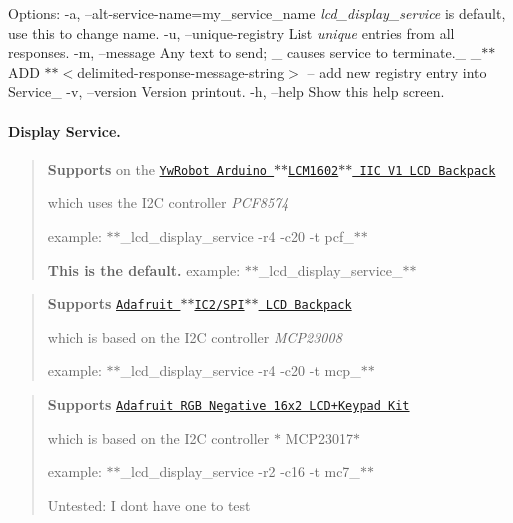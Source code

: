 Options\+: -\/a, --alt-\/service-\/name=my\+\_\+service\+\_\+name {\itshape lcd\+\_\+display\+\_\+service} is default, use this to change name. -\/u, --unique-\/registry List {\itshape unique} entries from all responses. -\/m, --message Any text to send; \+\_\+\textquotesingle{} causes service to terminate.\+\_\+ \+\_\+\textquotesingle{}$\ast$$\ast$\+A\+D\+D $\ast$$\ast$$<$delimited-\/response-\/message-\/string$>$\textquotesingle{} -- add new registry entry into Service\+\_\+ -\/v, --version Version printout. -\/h, --help Show this help screen.

\paragraph*{Display Service.}



\begin{quote}
{\bfseries Supports} on the \href{http://arduino-info.wikispaces.com/LCD-Blue-I2C}{\tt \textquotesingle{}Yw\+Robot Arduino $\ast$$\ast$\+L\+C\+M1602$\ast$$\ast$ I\+I\+C V1 L\+C\+D Backpack\textquotesingle{}}
\begin{DoxyItemize}
\item which uses the I2\+C controller {\itshape P\+C\+F8574}
\item example\+: $\ast$$\ast$\+\_\+lcd\+\_\+display\+\_\+service -\/r4 -\/c20 -\/t pcf\+\_\+$\ast$$\ast$
\item {\bfseries This is the default.} example\+: $\ast$$\ast$\+\_\+lcd\+\_\+display\+\_\+service\+\_\+$\ast$$\ast$ 
\end{DoxyItemize}\end{quote}


\begin{quote}
{\bfseries Supports} \href{https://www.adafruit.com/products/292}{\tt \textquotesingle{}Adafruit $\ast$$\ast$\+I\+C2/\+S\+P\+I$\ast$$\ast$ L\+C\+D Backpack\textquotesingle{}}
\begin{DoxyItemize}
\item which is based on the I2\+C controller {\itshape M\+C\+P23008}
\item example\+: $\ast$$\ast$\+\_\+lcd\+\_\+display\+\_\+service -\/r4 -\/c20 -\/t mcp\+\_\+$\ast$$\ast$ 
\end{DoxyItemize}\end{quote}


\begin{quote}
{\bfseries Supports} \href{https://www.adafruit.com/products/1110}{\tt \textquotesingle{}Adafruit R\+G\+B Negative 16x2 L\+C\+D+\+Keypad Kit\textquotesingle{}}
\begin{DoxyItemize}
\item which is based on the I2\+C controller $\ast$ M\+C\+P23017$\ast$
\item example\+: $\ast$$\ast$\+\_\+lcd\+\_\+display\+\_\+service -\/r2 -\/c16 -\/t mc7\+\_\+$\ast$$\ast$
\item Untested\+: I don\textquotesingle{}t have one to test 
\end{DoxyItemize}\end{quote}


